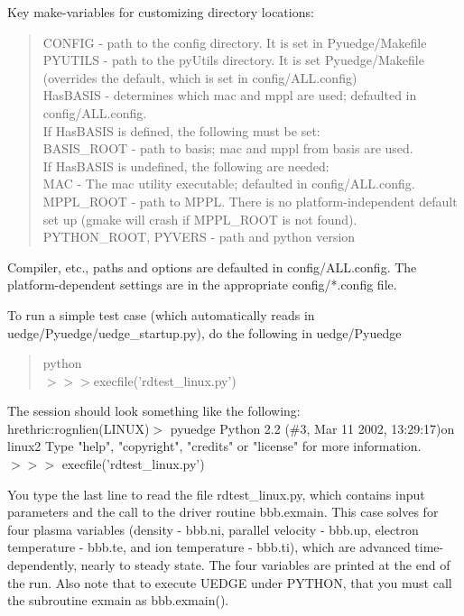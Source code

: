 \documentclass [12pt]{article}
\begin{document}
\begin{enumerate}
  Key make-variables for customizing directory locations:
  \begin{verse} 
   CONFIG   - path to the config directory. It is set in Pyuedge/Makefile \\
   PYUTILS  - path to the pyUtils directory. It is set Pyuedge/Makefile
              (overrides the default, which is set in config/ALL.config) \\
   HasBASIS - determines which mac and mppl are used;
              defaulted in config/ALL.config. \\

           \noindent  If HasBASIS is defined, the following must be set:\\
   BASIS\_ROOT  - path to basis; mac and mppl from basis are used.\\

           \noindent If HasBASIS is undefined, the following are needed:\\
   MAC         - The mac utility executable; defaulted in config/ALL.config.\\
   MPPL\_ROOT   - path to MPPL. There is no platform-independent default
                 set up (gmake will crash if MPPL\_ROOT is not found).\\
   PYTHON\_ROOT, PYVERS - path and python version\\
  \end{verse}

Compiler, etc., paths and options are defaulted in config/ALL.config. The
platform-dependent settings are in the appropriate config/*.config file.
\end{enumerate}

To run a simple test case (which automatically reads in 
    uedge/Pyuedge/uedge\_startup.py), do the following in uedge/Pyuedge
    \begin{verse}
      python \\
      $>>>$execfile('rdtest\_linux.py')
    \end{verse}
    
The session should look something like the following: \\
hrethric:rognlien(LINUX)$>$ pyuedge \hfil\break
Python 2.2 (\#3, Mar 11 2002, 13:29:17)\hfil{} on linux2\hfil\break
Type "help", "copyright", "credits" or "license" for more information.\hfil\break
$>>>$ execfile('rdtest\_linux.py')\hfil\break

You type the last line to read the file rdtest\_linux.py, which contains input
parameters and the call to the driver routine bbb.exmain.  This case solves
for four plasma variables (density - bbb.ni, parallel velocity - bbb.up,
electron temperature - bbb.te, and ion temperature - bbb.ti), which are
advanced time-dependently, nearly to steady state.  The four variables are
printed at the end of the run.  Also note that to execute {\sf UEDGE} under
{\sf PYTHON}, that you must call the subroutine {\sf exmain} as bbb.exmain().
\end{document}
